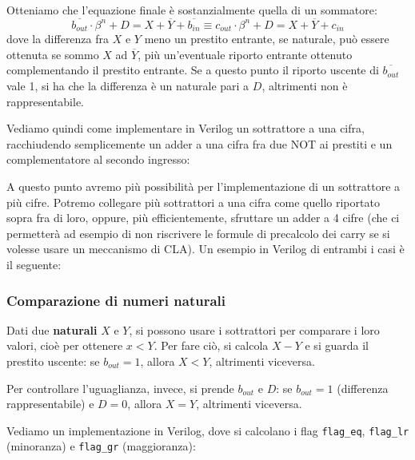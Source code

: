 \documentclass[a4paper,11pt]{article}
\begin{document}
Otteniamo che l'equazione finale è sostanzialmente quella di un sommatore:
$$ 
\overline{b_{out}} \cdot \beta^n + D = X + \overline{Y} + \overline{b_{in}} \equiv c_{out} \cdot \beta^n + D = X + \overline{Y} + c_{in}
$$
dove la differenza fra $X$ e $Y$ meno un prestito entrante, se naturale, può essere ottenuta se sommo $X$ ad $\overline{Y}$, più un'eventuale riporto entrante ottenuto complementando il prestito entrante.
Se a questo punto il riporto uscente di $\overline{b_{out}}$ vale 1, si ha che la differenza è un naturale pari a $D$, altrimenti non è rappresentabile.

Vediamo quindi come implementare in Verilog un sottrattore a una cifra, racchiudendo semplicemente un adder a una cifra fra due NOT ai prestiti e un complementatore al secondo ingresso:



A questo punto avremo più possibilità per l'implementazione di un sottrattore a più cifre.
Potremo collegare più sottrattori a una cifra come quello riportato sopra fra di loro, oppure, più efficientemente, sfruttare un adder a 4 cifre (che ci permetterà ad esempio di non riscrivere le formule di precalcolo dei carry se si volesse usare un meccanismo di CLA).
Un esempio in Verilog di entrambi i casi è il seguente:



\subsubsection{Comparazione di numeri naturali}
Dati due \textbf{naturali} $X$ e $Y$, si possono usare i sottrattori per comparare i loro valori, cioè per ottenere $x < Y$.
Per fare ciò, si calcola $X - Y$ e si guarda il prestito uscente: se $b_{out} = 1$, allora $X<Y$, altrimenti viceversa.

Per controllare l'uguaglianza, invece, si prende $b_{out}$ e $D$: se $b_{out} = 1$ (differenza rappresentabile) e $D=0$, allora $X = Y$, altrimenti viceversa.

Vediamo un implementazione in Verilog, dove si calcolano i flag \lstinline|flag_eq|, \lstinline|flag_lr| (minoranza) e \lstinline|flag_gr| (maggioranza):


\end{document}
